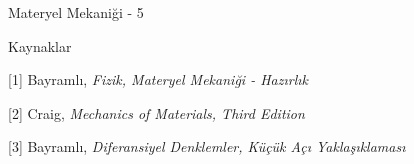 \documentclass[12pt,fleqn]{article}\usepackage{../../common}
\begin{document}
Materyel Mekaniği - 5





Kaynaklar

[1] Bayramlı, {\em Fizik, Materyel Mekaniği - Hazırlık}

[2] Craig, {\em Mechanics of Materials, Third Edition}

[3] Bayramlı, {\em Diferansiyel Denklemler, Küçük Açı Yaklaşıklaması}
\end{document}
